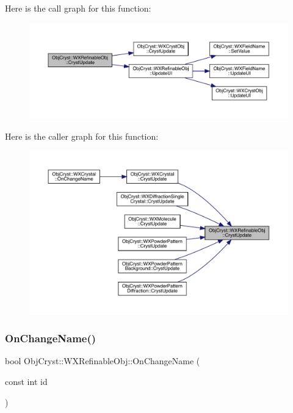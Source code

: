 Here is the call graph for this function\+:
\nopagebreak
\begin{figure}[H]
\begin{center}
\leavevmode
\includegraphics[width=350pt]{class_obj_cryst_1_1_w_x_refinable_obj_a8249d288e62ad1ebffeea91f77ae37a3_cgraph}
\end{center}
\end{figure}
Here is the caller graph for this function\+:
\nopagebreak
\begin{figure}[H]
\begin{center}
\leavevmode
\includegraphics[width=350pt]{class_obj_cryst_1_1_w_x_refinable_obj_a8249d288e62ad1ebffeea91f77ae37a3_icgraph}
\end{center}
\end{figure}
\mbox{\label{class_obj_cryst_1_1_w_x_refinable_obj_a1a13aaa3b69044cff0d1c257dea2acb0}} 
\subsubsection{\texorpdfstring{OnChangeName()}{OnChangeName()}}
{\footnotesize\ttfamily bool Obj\+Cryst\+::\+W\+X\+Refinable\+Obj\+::\+On\+Change\+Name (\begin{DoxyParamCaption}\item[{const int}]{id }\end{DoxyParamCaption})\hspace{0.3cm}{\ttfamily [virtual]}}

